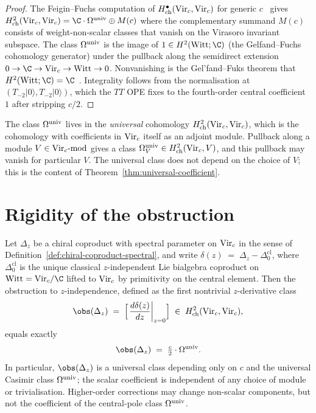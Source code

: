 \begin{proof}
The Feigin--Fuchs computation of $H^{\bullet}_{\mathrm{ch}}(\mathrm{Vir}_{c}, \mathrm{Vir}_{c})$ for
generic $c$~\cite{FF84} gives
$\Hchtwo(\Virc, \Virc) = \C \cdot \Cas \oplus M(c)$ where the
complementary summand $M(c)$ consists of weight-non-scalar classes
that vanish on the Virasoro invariant subspace. The class $\Omega^{\mathrm{univ}}$ is
the image of $1 \in H^{2}(\mathrm{Witt}; \C)$ (the Gelfand--Fuchs
cohomology generator) under the pullback along the semidirect
extension $0 \to \C \to \Virc \to \Witt \to 0$. Nonvanishing is the
Gel'fand--Fuks theorem that
$H^{2}(\mathrm{Witt}; \C) = \C$~\cite{Fuks86}. Integrality follows from
the normalisation at $(T_{-2}|0\rangle, T_{-2}|0\rangle)$, which the
$TT$ OPE fixes to the fourth-order central coefficient~$1$ after
stripping $c/2$.
\end{proof}

\begin{remark}
\label{rem:casimir-intrinsic}
The class $\Omega^{\mathrm{univ}}$ lives in the \emph{universal} cohomology
$H^{2}_{\mathrm{ch}}(\mathrm{Vir}_{c}, \mathrm{Vir}_{c})$, which is the cohomology with coefficients in
$\mathrm{Vir}_{c}$ itself as an adjoint module. Pullback along a module
$V \in \mathrm{Vir}_{c}\text{-mod}$ gives a class $\Omega^{\mathrm{univ}}_{V} \in
H^{2}_{\mathrm{ch}}(\mathrm{Vir}_{c}, V)$, and this pullback may vanish for particular $V$.
The universal class does not depend on the choice of $V$; this is the
content of Theorem~\ref{thm:universal-coefficient}.
\end{remark}

\section{Rigidity of the obstruction}
\label{sec:rigidity-theorem}

\begin{theorem}
\label{thm:conformal-anomaly-rigidity}
\ClaimStatusProvedHere
Let $\Delta_{z}$ be a chiral coproduct with spectral parameter on
$\mathrm{Vir}_{c}$ in the sense of
Definition~\ref{def:chiral-coproduct-spectral}, and write
$\delta(z) \;=\; \Delta_{z} - \Delta_{0}^{\mathrm{cl}}$, where
$\Delta_{0}^{\mathrm{cl}}$ is the unique classical $z$-independent
Lie bialgebra coproduct on $\Witt = \Virc/\C$ lifted to $\mathrm{Vir}_{c}$ by
primitivity on the central element. Then the obstruction to
$z$-independence, defined as the first nontrivial $z$-derivative class
\[
\obs(\Delta_{z}) \;=\;
\Bigl[ \left.\frac{d\delta(z)}{dz}\right|_{z = 0} \Bigr]
\;\in\; \Hchtwo(\Virc, \Virc),
\]
equals exactly
\[
\obs(\Delta_{z}) \;=\; \tfrac{c}{2} \cdot \Cas.
\]
In particular, $\obs(\Delta_{z})$ is a universal class depending only
on $c$ and the universal Casimir class $\Omega^{\mathrm{univ}}$; the scalar coefficient
is independent of any choice of module or trivialisation. Higher-order
corrections may change non-scalar components, but not the coefficient
of the central-pole class $\Omega^{\mathrm{univ}}$.
\end{theorem}

